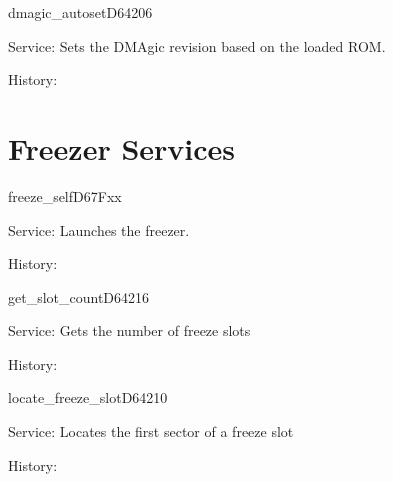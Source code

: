 \begin{hyppotrap}{dmagic\_autoset}{D642}{06}
\item [Service:]
  Sets the DMAgic revision based on the loaded ROM.
\item [History:]
\end{hyppotrap}



\newpage
\section{Freezer Services}


\begin{hyppotrap}{freeze\_self}{D67F}{xx}
\item [Service:]
  Launches the freezer.
\item [History:]
\end{hyppotrap}


\begin{hyppotrap}{get\_slot\_count}{D642}{16}
\item [Service:]
  Gets the number of freeze slots
\item [History:]
\end{hyppotrap}


\begin{hyppotrap}{locate\_freeze\_slot}{D642}{10}
\item [Service:]
  Locates the first sector of a freeze slot
\item [History:]
\end{hyppotrap}


